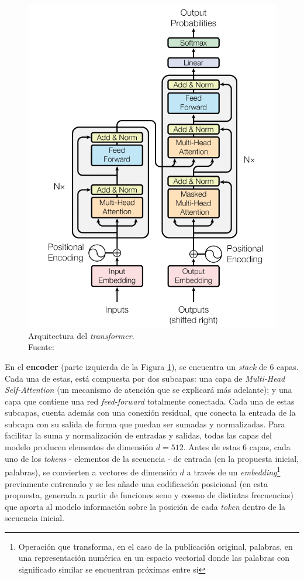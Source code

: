 \begin{figure}
\includegraphics[width=0.95\linewidth]{imagenes/transformer-arquitectura.png} 
\caption{Arquitectura del \textit{transformer}.\\Fuente: \cite{NIPS2017_3f5ee243}}
\label{fig:arquitectura-transformer}
\end{figure}

\vspace{2mm}
En el \textbf{encoder} (parte izquierda de la Figura \ref{fig:arquitectura-transformer}), se encuentra un \textit{stack} de 6 capas. Cada una de estas, está compuesta por dos subcapas: una capa de \textit{Multi-Head Self-Attention} (un mecanismo de atención que se explicará más adelante); y una capa que contiene una red \textit{feed-forward} totalmente conectada. Cada una de estas subcapas, cuenta además con una conexión residual, que conecta la entrada de la subcapa con su salida de forma que puedan ser sumadas y normalizadas. Para facilitar la suma y normalización de entradas y salidas, todas las capas del modelo producen elementos de dimensión $d=512$. Antes de estas 6 capas, cada uno de los \textit{tokens} - elementos de la secuencia - de entrada (en la propuesta inicial, palabras), se convierten a vectores de dimensión $d$ a través de un \textit{embedding}\footnote{Operación que transforma, en el caso de la publicación original, palabras, en una representación numérica en un espacio vectorial donde las palabras con significado similar se encuentran próximas entre sí} previamente entrenado y se les añade una codificación posicional (en esta propuesta, generada a partir de funciones seno y coseno de distintas frecuencias) que aporta al modelo información sobre la posición de cada \textit{token} dentro de la secuencia inicial.

